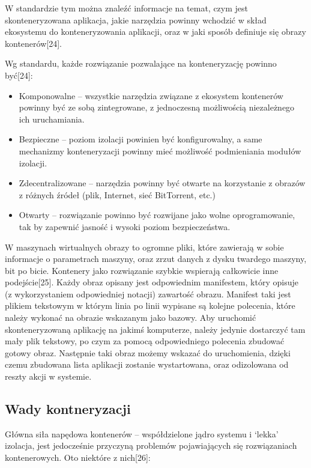 \documentclass[10pt,a4paper,titlepage,twoside]{report}
\begin{document}
\indent \indent W standardzie tym można znaleźć informacje na temat, czym jest skonteneryzowana aplikacja, jakie narzędzia powinny wchodzić w skład ekosystemu do konteneryzowania aplikacji, oraz w jaki sposób definiuje się obrazy kontenerów[24].

\indent \indent Wg standardu, każde rozwiązanie pozwalające na konteneryzację powinno być[24]:
\begin{itemize}
	\item Komponowalne – wszystkie narzędzia związane z ekosystem kontenerów powinny być ze sobą zintegrowane, z jednoczesną możliwością niezależnego ich uruchamiania.
	\item Bezpieczne – poziom izolacji powinien być konfigurowalny, a same mechanizmy konteneryzacji powinny mieć możliwość podmieniania modułów izolacji.
	\item Zdecentralizowane – narzędzia powinny być otwarte na korzystanie z obrazów z różnych źródeł (plik, Internet, sieć BitTorrent, etc.)
	\item Otwarty – rozwiązanie powinno być rozwijane jako wolne oprogramowanie, tak by zapewnić jasność i wysoki poziom bezpieczeństwa.
\end{itemize}

W maszynach wirtualnych obrazy to ogromne pliki, które zawierają w sobie informacje o parametrach maszyny, oraz zrzut danych z dysku twardego maszyny, bit po bicie. Kontenery jako rozwiązanie szybkie wspierają całkowicie inne podejście[25]. Każdy obraz opisany jest odpowiednim manifestem, który opisuje (z wykorzystaniem odpowiedniej notacji) zawartość obrazu. Manifest taki jest plikiem tekstowym w którym linia po linii wypisane są kolejne polecenia, które należy wykonać na obrazie wskazanym jako bazowy. Aby uruchomić skonteneryzowaną aplikację na jakimś komputerze, należy jedynie dostarczyć tam mały plik tekstowy, po czym za pomocą odpowiedniego polecenia zbudować gotowy obraz. Następnie taki obraz możemy wskazać do uruchomienia, dzięki czemu zbudowana lista aplikacji zostanie wystartowana, oraz odizolowana od reszty akcji w systemie.

\subsection{Wady kontneryzacji}\indent \indent Główna siła napędowa kontenerów – współdzielone jądro systemu i ‘lekka’ izolacja, jest jedocześnie przyczyną problemów pojawiających się rozwiązaniach kontenerowych. Oto niektóre z nich[26]:
\end{document}
